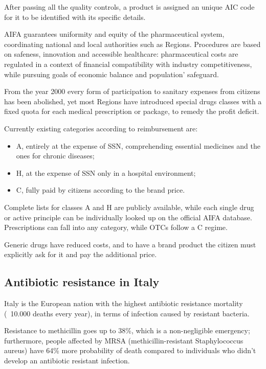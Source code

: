 After passing all the quality controls, a product is assigned an unique AIC code for it to be identified with its specific details.

AIFA guarantees uniformity and equity of the pharmaceutical system, coordinating national and local authorities such as Regions. Procedures are based on safeness, innovation and accessible healthcare: pharmaceutical costs are regulated in a context of financial compatibility with industry competitiveness, while pursuing goals of economic balance and population' safeguard.

From the year 2000 every form of participation to sanitary expenses from citizens has been abolished\cite{ticket}, yet most Regions have introduced special drugs classes with a fixed quota for each medical prescription or package, to remedy the profit deficit. 

Currently existing categories according to reimbursement are\cite{classi}:
\begin{itemize}
	\item A, entirely at the expense of SSN, comprehending essential medicines and the ones for chronic diseases;
	\item H, at the expense of SSN only in a hospital environment;
	\item C, fully paid by citizens according to the brand price.
\end{itemize}
Complete lists for classes A and H are publicly available, while each single drug or active principle can be individually looked up on the official AIFA database. Prescriptions can fall into any category, while OTCs follow a C regime. 

Generic drugs have reduced costs, and to have a brand product the citizen must explicitly ask for it and pay the additional price\cite{ticket}.

\subsection{Antibiotic resistance in Italy}
Italy is the European nation with the highest antibiotic resistance mortality (~10.000 deaths every year), in terms of infection caused by resistant bacteria\cite{repubblica}. 

Resistance to methicillin goes up to 38\%, which is a non-negligible emergency; furthermore, people affected by MRSA (methicillin-resistant Staphylococcus aureus) have 64\% more probability of death compared to individuals who didn't develop an antibiotic resistant infection\cite{agenziafarmaco}.

